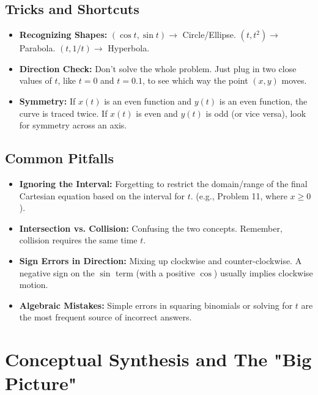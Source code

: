 \documentclass{article}
\begin{document}
\subsection{Tricks and Shortcuts}
\begin{itemize}
    \item \textbf{Recognizing Shapes:} \((\cos t, \sin t) \to\) Circle/Ellipse. \((t, t^2) \to\) Parabola. \((t, 1/t) \to\) Hyperbola.
    \item \textbf{Direction Check:} Don't solve the whole problem. Just plug in two close values of \(t\), like \(t=0\) and \(t=0.1\), to see which way the point \((x,y)\) moves.
    \item \textbf{Symmetry:} If \(x(t)\) is an even function and \(y(t)\) is an even function, the curve is traced twice. If \(x(t)\) is even and \(y(t)\) is odd (or vice versa), look for symmetry across an axis.
\end{itemize}
\subsection{Common Pitfalls}
\begin{itemize}
    \item \textbf{Ignoring the Interval:} Forgetting to restrict the domain/range of the final Cartesian equation based on the interval for \(t\). (e.g., Problem 11, where \(x \ge 0\)).
    \item \textbf{Intersection vs. Collision:} Confusing the two concepts. Remember, collision requires the same time \(t\).
    \item \textbf{Sign Errors in Direction:} Mixing up clockwise and counter-clockwise. A negative sign on the \(\sin\) term (with a positive \(\cos\)) usually implies clockwise motion.
    \item \textbf{Algebraic Mistakes:} Simple errors in squaring binomials or solving for \(t\) are the most frequent source of incorrect answers.
\end{itemize}

\section{Conceptual Synthesis and The "Big Picture"}
\end{document}
